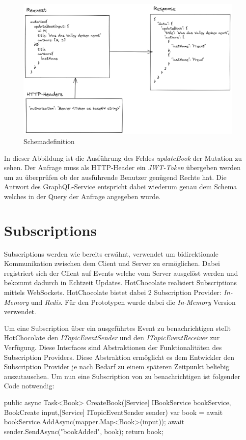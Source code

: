 
\begin{figure}[H]
    \includegraphics[width=\textwidth]{pics/execution_mutation.png}
    \caption{Schemadefinition}
\end{figure}

In dieser Abbildung ist die Ausführung des Feldes \textit{updateBook} der Mutation zu sehen.
Der Anfrage muss als HTTP-Header ein \textit{JWT-Token} übergeben werden um zu überprüfen ob der ausführende Benutzer genügend Rechte hat.
Die Antwort des GraphQL-Service entspricht dabei wiederum genau dem Schema welches in der Query der Anfrage angegeben wurde.


\section{Subscriptions}
Subscriptions werden wie bereits erwähnt, verwendet um bidirektionale Kommunikation zwischen dem Client und Server zu ermöglichen.
Dabei registriert sich der Client auf Events welche vom Server ausgelöst werden und bekommt dadurch in Echtzeit Updates.
HotChocolate realisiert Subscriptions mittels WebSockets.
HotChocolate bietet dabei 2 Subscription Provider: \textit{In-Memory} und \textit{Redis}.
Für den Prototypen wurde dabei die \textit{In-Memory} Version verwendet.

Um eine Subscription über ein ausgeführtes Event zu benachrichtigen stellt HotChocolate den \textit{ITopicEventSender} und den \textit{ITopicEventReceiver} zur Verfügung.
Diese Interfaces sind Abstraktionen der Funktionalitäten des Subscription Providers.
Diese Abstraktion ermöglicht es dem Entwickler den Subscription Provider je nach Bedarf zu einem späteren Zeitpunkt beliebig auszutauschen.
Um nun eine Subscription von zu benachrichtigen ist folgender Code notwendig:
\begin{JsCode}
public async Task<Book> CreateBook([Service] IBookService bookService, BookCreate input,[Service] ITopicEventSender sender) {
    var book = await bookService.AddAsync(mapper.Map<Book>(input));
    await sender.SendAsync("bookAdded", book);
    return book;
}
\end{JsCode}

